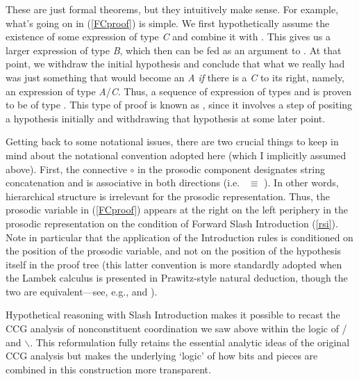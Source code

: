\documentclass[output=paper]{langsci/langscibook}
\begin{document}
\noindent
These are just formal theorems, but they intuitively make sense.
For example, what's going on in  (\ref{FCproof}) is simple. We first
hypothetically assume the existence of some expression of type
\textit{C} and combine it with . This gives us a larger expression
of type \textit{B}, which then can be fed as an argument to  .
At that point, we withdraw the initial hypothesis and conclude that
what we really had was just something that would become an \textit{A} \emph{if}
there is a \textit{C} to its right, namely, an expression of type \textit{A}/\textit{C}.
Thus, a sequence of expression of types  and 
is proven to be of type .  This type of proof
is known as , since it involves a step of
positing a hypothesis initially and withdrawing that hypothesis
at some later point.

Getting back to some notational issues, there are two crucial things
to keep in mind about the notational 
convention adopted here (which I implicitly assumed above). First, the
connective \ensuremath{\circ}\xspace in the prosodic component designates string
concatenation and is associative in both directions
(i.e.\  \pt{ (\ensuremath{\greekp_1} \ensuremath{\circ}\xspace \ensuremath{\greekp_2}) \ensuremath{\circ}\xspace \ensuremath{\greekp_3}} \ensuremath{ \equiv\xspace } \pt{ \ensuremath{\greekp_1} \ensuremath{\circ}\xspace (\ensuremath{\greekp_2} \ensuremath{\circ}\xspace \ensuremath{\greekp_3}) }). In other words, hierarchical
structure is irrelevant for the prosodic representation. Thus, the
prosodic variable \pt{ \ensuremath{\greekp} } in (\ref{FCproof}) appears at the right on the
left periphery in the prosodic representation
\pt{\ptv{a} \ensuremath{\circ}\xspace \ptv{b} \ensuremath{\circ}\xspace \ensuremath{\greekp} } on the condition of Forward Slash
Introduction (\ref{rsi}). Note in particular that the application of the
Introduction rules is conditioned on the position of the prosodic
variable, and not on the position of the hypothesis itself in the
proof tree (this latter convention is more standardly adopted when the
Lambek calculus is presented in Prawitz-style natural deduction, though the two are
equivalent---see, e.g., \citet{Carpenter98a-u} and \citet{jaeger05}).

Hypothetical reasoning with Slash Introduction makes it possible to
recast the CCG analysis of nonconstituent coordination we saw above
within the logic of / and $\backslash$. This reformulation fully
retains the essential analytic ideas of the original CCG analysis but
makes the underlying `logic' of how bits and pieces are combined in
this construction more transparent.
\end{document}
